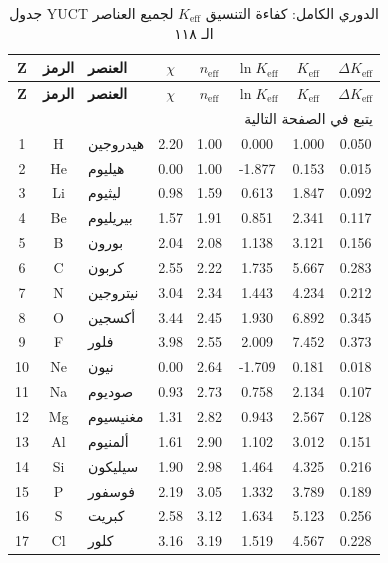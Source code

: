 \documentclass[12pt,a4paper]{article}
\theoremstyle{remark}
\newcommand{\Keff}{K_{\mathrm{eff}}}
\begin{document}
	\begin{longtable}{|c|c|p{2.5cm}|c|c|c|c|c|}
		\caption{جدول YUCT الدوري الكامل: كفاءة التنسيق $\Keff$ لجميع العناصر الـ ١١٨}
		\label{tab:complete-periodic} \\
		\hline
		\textbf{Z} & \textbf{الرمز} & \textbf{العنصر} & $\chi$ & $n_{\text{eff}}$ & $\ln \Keff$ & $\Keff$ & $\Delta \Keff$ \\
		\hline
		\endfirsthead
		\hline
		\textbf{Z} & \textbf{الرمز} & \textbf{العنصر} & $\chi$ & $n_{\text{eff}}$ & $\ln \Keff$ & $\Keff$ & $\Delta \Keff$ \\
		\hline
		\endhead
		\hline \multicolumn{8}{|r|}{{يتبع في الصفحة التالية}} \\ \hline
		\endfoot
		\hline
		\endlastfoot
		
		1  & H  & هيدروجين      & 2.20 & 1.00 & 0.000  & 1.000  & 0.050 \\
		2  & He & هيليوم        & 0.00 & 1.00 & -1.877 & 0.153  & 0.015 \\
		3  & Li & ليثيوم        & 0.98 & 1.59 & 0.613  & 1.847  & 0.092 \\
		4  & Be & بيريليوم      & 1.57 & 1.91 & 0.851  & 2.341  & 0.117 \\
		5  & B  & بورون         & 2.04 & 2.08 & 1.138  & 3.121  & 0.156 \\
		6  & C  & كربون         & 2.55 & 2.22 & 1.735  & 5.667  & 0.283 \\
		7  & N  & نيتروجين      & 3.04 & 2.34 & 1.443  & 4.234  & 0.212 \\
		8  & O  & أكسجين        & 3.44 & 2.45 & 1.930  & 6.892  & 0.345 \\
		9  & F  & فلور          & 3.98 & 2.55 & 2.009  & 7.452  & 0.373 \\
		10 & Ne & نيون          & 0.00 & 2.64 & -1.709 & 0.181  & 0.018 \\
		11 & Na & صوديوم        & 0.93 & 2.73 & 0.758  & 2.134  & 0.107 \\
		12 & Mg & مغنيسيوم      & 1.31 & 2.82 & 0.943  & 2.567  & 0.128 \\
		13 & Al & ألمنيوم       & 1.61 & 2.90 & 1.102  & 3.012  & 0.151 \\
		14 & Si & سيليكون       & 1.90 & 2.98 & 1.464  & 4.325  & 0.216 \\
		15 & P  & فوسفور        & 2.19 & 3.05 & 1.332  & 3.789  & 0.189 \\
		16 & S  & كبريت         & 2.58 & 3.12 & 1.634  & 5.123  & 0.256 \\
		17 & Cl & كلور          & 3.16 & 3.19 & 1.519  & 4.567  & 0.228 \\

\end{longtable}
\end{document}

